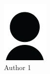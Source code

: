 \begin{figure}
    \centering
    \begin{subfigure}[b]{0.2\textwidth}
        \centering
        \includegraphics[width=\textwidth]{figs/cv/author}
        \caption{Author 1}
        \label{fig:c1:auth1}
    \end{subfigure}
    \hfill
    \begin{subfigure}[b]{0.2\textwidth}
        \centering

\end{subfigure}
\end{figure}
